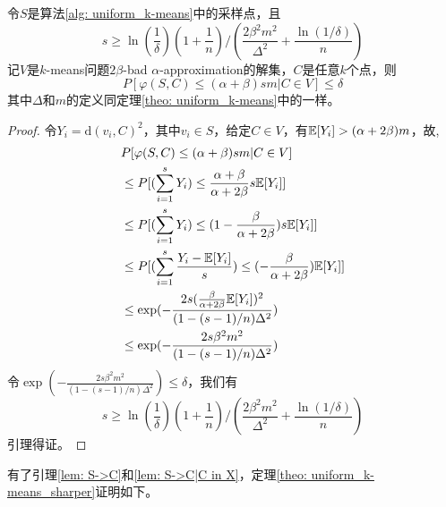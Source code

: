 \begin{lemma}
    \label{lem: S->C|C in X}
    令$S$是算法\ref{alg: uniform_k-means}中的采样点，且
    \begin{equation}
    s \geq \ln(\frac{1}{\delta})(1+\frac{1}{n})/(\frac{2\beta^2 m^2}{\Delta^2}+\frac{\ln(1/\delta)}{n})
    \end{equation}
    记$V$是$k$-means问题$2\beta$-bad $\alpha$-approximation的解集，$C$是任意$k$个点，则
    \begin{equation}
    P[\varphi(S,C) \leq (\alpha+\beta)sm | C \in V] \leq \delta
    \end{equation}
    其中$\Delta$和$m$的定义同定理\ref{theo: uniform_k-means}中的一样。
\end{lemma}
\begin{proof}
    令$Y_i = \text{d}(v_i,C)^2$，其中$v_i \in S$，给定$C \in V$，有$\mathbb{E}[Y_i] > (\alpha+2\beta)m$，故,
    \begin{align}
    &P[\varphi(S,C) \leq (\alpha+\beta)sm | C \in V] \\
    &\leq P[(\sum_{i=1}^s Y_i) \leq \frac{\alpha+\beta}{\alpha+2\beta}s\mathbb{E}[Y_i]] \\
    &\leq P[(\sum_{i=1}^s Y_i) \leq (1-\frac{\beta}{\alpha+2\beta})s\mathbb{E}[Y_i]] \\
    &\leq P[(\sum_{i=1}^s \frac{Y_i - \mathbb{E}[Y_i]}{s}) \leq (-\frac{\beta}{\alpha+2\beta})\mathbb{E}[Y_i]] \\
    &\leq \exp(-\frac{2s(\frac{\beta}{\alpha+2\beta}\mathbb{E}[Y_i])^2}{(1-(s-1)/n)\Delta^2}) \\
    &\leq \exp(-\frac{2s\beta^2 m^2}{(1-(s-1)/n)\Delta^2})
    \end{align}
    令$\exp(-\frac{2s\beta^2 m^2}{(1-(s-1)/n)\Delta^2}) \leq \delta$，我们有
    \begin{equation}
    s \geq \ln(\frac{1}{\delta})(1+\frac{1}{n})/(\frac{2\beta^2 m^2}{\Delta^2}+\frac{\ln(1/\delta)}{n})
    \end{equation}
    引理得证。
\end{proof}
有了引理\ref{lem: S->C}和\ref{lem: S->C|C in X}，定理\ref{theo: uniform_k-means_sharper}证明如下。
